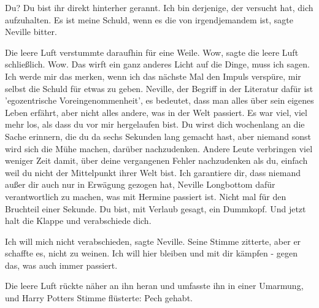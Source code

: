 \glqq{}Du? Du bist ihr direkt hinterher gerannt. Ich bin derjenige, der versucht
hat, dich aufzuhalten. Es ist meine Schuld, wenn es die von irgendjemandem
ist\grqq{}, sagte Neville bitter.

Die leere Luft verstummte daraufhin für eine Weile. \glqq{}Wow\grqq{}, sagte die
leere Luft schließlich. \glqq{}Wow. Das wirft ein ganz anderes Licht auf die
Dinge, muss ich sagen. Ich werde mir das merken, wenn ich das nächste Mal den
Impuls verspüre, mir selbst die Schuld für etwas zu geben. Neville, der Begriff
in der Literatur dafür ist 'egozentrische Voreingenommenheit', es bedeutet, dass
man alles über sein eigenes Leben erfährt, aber nicht alles andere, was in der
Welt passiert. Es war viel, viel mehr los, als dass du vor mir hergelaufen bist.
Du wirst dich wochenlang an die Sache erinnern, die du da sechs Sekunden lang
gemacht hast, aber niemand sonst wird sich die Mühe machen, darüber
nachzudenken. Andere Leute verbringen viel weniger Zeit damit, über deine
vergangenen Fehler nachzudenken als du, einfach weil du nicht der Mittelpunkt
ihrer Welt bist. Ich garantiere dir, dass niemand außer dir auch nur in Erwägung
gezogen hat, Neville Longbottom dafür verantwortlich zu machen, was mit Hermine
passiert ist. Nicht mal für den Bruchteil einer Sekunde. Du bist, mit Verlaub
gesagt, ein Dummkopf. Und jetzt halt die Klappe und verabschiede dich.\grqq{}

\glqq{}Ich will mich nicht verabschieden\grqq{}, sagte Neville. Seine Stimme
zitterte, aber er schaffte es, nicht zu weinen. \glqq{}Ich will hier bleiben und
mit dir kämpfen - gegen das, was auch immer passiert.\grqq{}

Die leere Luft rückte näher an ihn heran und umfasste ihn in einer Umarmung, und
Harry Potters Stimme flüsterte: \glqq{}Pech gehabt.\grqq{}


